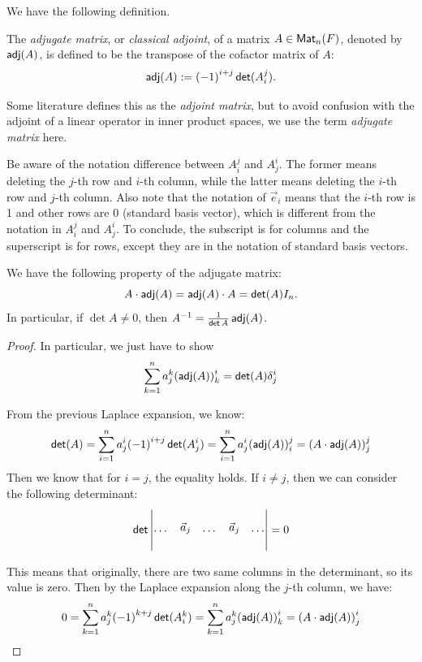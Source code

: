 We have the following definition.
\begin{definition}\label{def:adjugate_matrix}
  The \emph{adjugate matrix}, or \emph{classical adjoint}, of a matrix $A \in \operatorname{\text{\normalfont\sffamily Mat}}_n(F)$, denoted by $\operatorname{\text{\normalfont\sffamily adj}}(A)$, is defined to be the transpose of the cofactor matrix of $A$:
  \[
    \operatorname{\text{\normalfont\sffamily adj}}(A) := {(-1)}^{i + j} \operatorname{\text{\normalfont\sffamily det}}(A^j_i).
  \]
\end{definition}
Some literature defines this as the \emph{adjoint matrix}, but to avoid confusion with the adjoint of a linear operator in inner product spaces, we use the term \emph{adjugate matrix} here.
\begin{remark}
  Be aware of the notation difference between $A_i^j$ and $A^i_j$. The former means deleting the $j$-th row and $i$-th column, while the latter means deleting the $i$-th row and $j$-th column. Also note that the notation of $\vec{e}_i$ means that the $i$-th row is 1 and other rows are 0 (standard basis vector), which is different from the notation in $A_i^j$ and $A^i_j$. To conclude, the subscript is for columns and the superscript is for rows, except they are in the notation of standard basis vectors.
\end{remark}

\begin{proposition}
  We have the following property of the adjugate matrix:
  \[
    A \cdot \operatorname{\text{\normalfont\sffamily adj}}(A) = \operatorname{\text{\normalfont\sffamily adj}}(A) \cdot A = \operatorname{\text{\normalfont\sffamily det}}(A) I_n.
  \]
  In particular, if $\det A \neq 0$, then $A^{-1} = \frac{1}{\operatorname{\text{\normalfont\sffamily det}} A} \operatorname{\text{\normalfont\sffamily adj}}(A)$.
\end{proposition}
\begin{proof}
  In particular, we just have to show
  \[
    \sum_{k = 1}^n a^k_j {(\operatorname{\text{\normalfont\sffamily adj}}(A))}^i_k = \operatorname{\text{\normalfont\sffamily det}}(A) \delta^i_j
  \]

  From the previous Laplace expansion, we know:
  \[
    \operatorname{\text{\normalfont\sffamily det}}(A) = \sum_{i = 1}^n a_j^i {(-1)}^{i + j} \operatorname{\text{\normalfont\sffamily det}}(A^i_j) = \sum_{i = 1}^n a_j^i {(\operatorname{\text{\normalfont\sffamily adj}}(A))}_i^j = {(A \cdot \operatorname{\text{\normalfont\sffamily adj}}(A))}_j^j
  \]
  Then we know that for $i = j$, the equality holds. If $i \neq j$, then we can consider the following determinant:
  \vspace{4ex}
  \[
    \det \begin{vmatrix}
      \\
      \cdots & \point{icol}{\vec{a}_j} & \cdots & \point{jcol}{\vec{a}_j} & \cdots \\
      \\
    \end{vmatrix} = 0
  \]
  \vspace{4ex}

  This means that originally, there are two same columns in the determinant, so its value is zero. Then by the Laplace expansion along the $j$-th column, we have:
  \[
    0 = \sum_{k = 1}^n a_j^k {(-1)}^{k + j} \operatorname{\text{\normalfont\sffamily det}}(A^k_i) = \sum_{k = 1}^n a_j^k {(\operatorname{\text{\normalfont\sffamily adj}}(A))}_k^i = {(A \cdot \operatorname{\text{\normalfont\sffamily adj}}(A))}_j^i
  \]
\end{proof}


